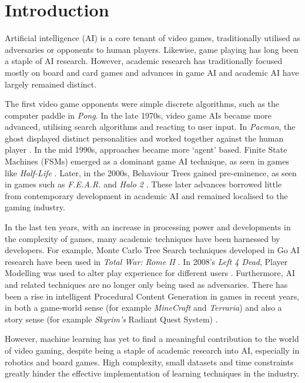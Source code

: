 

\section{Introduction}

Artificial intelligence (AI) is a core tenant of video games, traditionally utilised as adversaries or opponents to human players. Likewise, game playing has long been a staple of AI research. However, academic research has traditionally focused mostly on board and card games and advances in game AI and academic AI have largely remained distinct.

The first video game opponents were simple discrete algorithms, such as the computer paddle in \emph{Pong}. In the late 1970s, video game AIs became more advanced, utilising search algorithms and reacting to user input. In \emph{Pacman}, the ghost displayed distinct personalities and worked together against the human player \cite{pacmanghosts}. In the mid 1990s, approaches became more `agent' based. Finite State Machines (FSMs) emerged as a dominant game AI technique, as seen in games like \emph{Half-Life} \cite{halflife}. Later, in the 2000s, Behaviour Trees gained pre-eminence, as seen in games such as \emph{F.E.A.R.} \cite{fear} and \emph{Halo 2} \cite{halo}. These later advances borrowed little from contemporary development in academic AI and remained localised to the gaming industry.

In the last ten years, with an increase in processing power and developments in the complexity of games, many academic techniques have been harnessed by developers. For example, Monte Carlo Tree Search techniques developed in Go AI research have been used in \emph{Total War: Rome II} \cite{rome}. In 2008's \emph{Left 4 Dead}, Player Modelling was used to alter play experience for different users \cite[p.~10]{playermod}. Furthermore, AI and related techniques are no longer only being used as adversaries. There has been a rise in intelligent Procedural Content Generation in games in recent years, in both a game-world sense (for example \emph{MineCraft} and \emph{Terraria}) and also a story sense (for example \emph{Skyrim's} Radiant Quest System) \cite{skyrim}.

However, machine learning has yet to find a meaningful contribution to the world of video gaming, despite being a staple of academic research into AI, especially in robotics and board games. High complexity, small datasets and time constraints greatly hinder the effective implementation of learning techniques in the industry.

